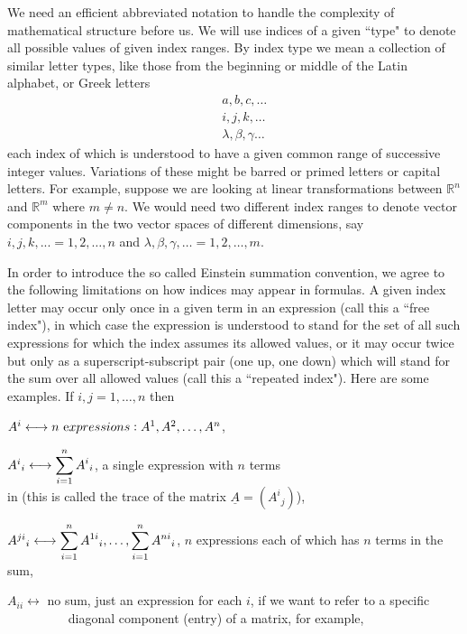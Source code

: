 We need an efficient abbreviated notation to handle the complexity of mathematical structure before us. We will use indices of a given ``type" to denote all possible values of given index ranges. By index type we mean a collection of similar letter types, like those from the beginning or middle of the Latin alphabet, or Greek letters
\begin{eqnarray}
&& a,b,c,\ldots
\nonumber\\
&& i,j,k,\ldots
\nonumber\\
&& \lambda,\beta,\gamma\ldots
\nonumber
\end{eqnarray}
each index of which is understood to have a given common range of successive integer values.
Variations of these might be barred or primed letters or capital letters.
For example, suppose we are looking at linear transformations between ${\mathbb R}^n$ and ${\mathbb R}^m$ where $m\ne n$. We would need two different index ranges to denote vector components in the two vector spaces of different dimensions, say 
$i,j,k,...=1,2,\ldots,n$  and $\lambda,\beta,\gamma,\ldots=1,2,\ldots,m$.

In order to introduce the so called Einstein summation convention, we agree to the following limitations on how indices may appear in formulas.
A given index letter may occur only once in a given term in an expression (call this a ``free index"), in which case the expression is understood to stand for the set of all such expressions for which the index assumes its allowed values, or  it may occur twice but only as a superscript-subscript pair (one up, one down) which will stand for the sum over all allowed values (call this a ``repeated index"). Here are some examples. If $i,j=1,\ldots,n$ then

\medskip
$A^i \longleftrightarrow 
n\ {\textrm expressions}: A^1,A^2,\ldots,A^n$,

$A^i{}_{i}\longleftrightarrow 
\displaystyle\sum_{i=1}^n A^i{}_{i}$, a single expression with $n$ terms \\
\null{} in 
(this is called the trace of the matrix $\underline{A}=(A^i{}_j)$),

$A^{ji}{}_{i}\longleftrightarrow 
\displaystyle\sum_{i=1}^n A^{1i}{}_{i},\ldots, \displaystyle\sum_{i=1}^n A^{ni}{}_{i}$, $n$ expressions each of which has $n$ terms in the sum, 	
 
$A_{ii}\longleftrightarrow$ no sum, just an expression for each $i$, if we want to refer to a specific
\\ $\phantom{A_{ii}\longleftrightarrow {\quad }}$\ \
 diagonal component (entry) of a matrix, for example,

